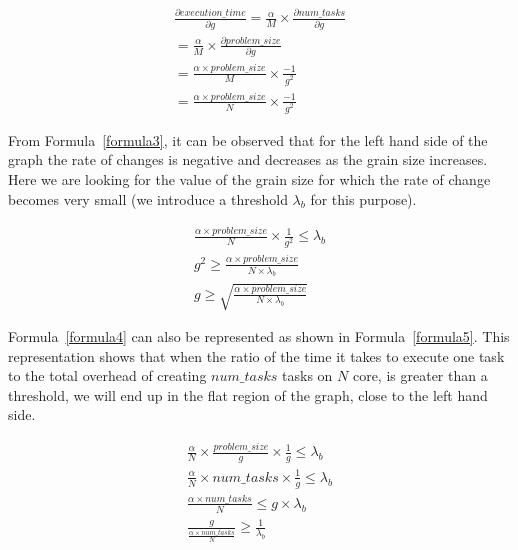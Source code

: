  
\begin{equation}\label{formula3}
\begin{aligned}
\frac{\partial execution\_{time}}{\partial g} = \frac{\alpha}{M}\times{\frac{\partial num\_{tasks}}{\partial g}} \\
=\frac{\alpha}{M}\times\frac{\partial problem\_{size}}{\partial g} \\
=\frac{\alpha\times{problem\_{size}}}{M}\times{\frac{-1}{g^2}}
\\
=\frac{\alpha\times{problem\_{size}}}{N}\times{\frac{-1}{g^2}}
\end{aligned}
\end{equation}

From Formula~\ref{formula3}, it can be observed that for the left hand side of the graph the rate of changes is negative and decreases as the grain size increases. Here we are looking for the value of the grain size for which the rate of change becomes very small (we introduce a threshold $\lambda_b$ for this purpose). 


\begin{equation}\label{formula4}
\begin{aligned}
\frac{\alpha\times{problem\_{size}}}{N}\times{\frac{1}{g^2}}\leq{\lambda_b} \\
{g^2}\geq{\frac{\alpha\times{problem\_{size}}}{N\times{\lambda_b}}}\\
{g}\geq{\sqrt{\frac{\alpha\times{problem\_{size}}}{N\times{\lambda_b}}}}
\end{aligned}
\end{equation}

Formula~\ref{formula4} can also be represented as shown in Formula~\ref{formula5}. This representation shows that when the ratio of the time it takes to execute one task to the total overhead of creating $num\_{tasks}$ tasks on $N$ core, is greater than a threshold, we will end up in the flat region of the graph, close to the left hand side.


\begin{equation}\label{formula5}
\begin{aligned}
\frac{\alpha}{N}\times{\frac{problem\_{size}}{g}}\times{\frac{1}{g}}\leq{\lambda_b} \\
\frac{\alpha}{N}\times{num\_{tasks}}\times{\frac{1}{g}}\leq{\lambda_b}\\
\frac{\alpha\times{num\_{tasks}}}{N}\leq{g\times\lambda_b}\\	
\frac{g}{\frac{\alpha\times{num\_{tasks}}}{N}}\geq{\frac{1}{\lambda_b}}
\end{aligned}
\end{equation}


